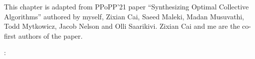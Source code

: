 \newcommand{\broadcasting}{non-com\-bin\-ing\xspace}
\newcommand{\broadcastingCap}{Non-com\-bin\-ing\xspace}
\newcommand{\reducing}{com\-bin\-ing\xspace}
\newcommand{\reducingCap}{Com\-bin\-ing\xspace}

\newcommand{\etal}{\textit{et al}.}

This chapter is adapted from PPoPP'21 paper ``Synthesizing Optimal
Collective Algorithms'' authored by myself, Zixian Cai, Saeed Maleki,
Madan Musuvathi, Todd Mytkowicz, Jacob Nelson and Olli Saarikivi.
Zixian Cai and me are the co-first authors of the paper.








:
